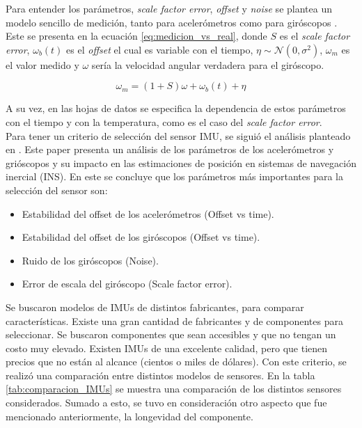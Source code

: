 Para entender los parámetros, \textit{scale factor error}, \textit{offset} y \textit{noise} se plantea un modelo sencillo de medición, tanto para acelerómetros como para giróscopos \cite{borodacz2022review}. Este se presenta en la ecuación \eqref{eq:medicion_vs_real}, donde $S$ es el \textit{scale factor error}, $\omega_b(t)$ es el \textit{offset} el cual es variable con el tiempo, $\eta \sim \mathcal{N}(0,\sigma^2)$, $\omega_m$ es el valor medido y $\omega$ sería la velocidad angular verdadera para el giróscopo.

\begin{equation}
    \omega_m = (1+S)\omega + \omega_b (t) + \eta
    \label{eq:medicion_vs_real}
\end{equation}

A su vez, en las hojas de datos se especifica la dependencia de estos parámetros con el tiempo y con la temperatura, como es el caso del \textit{scale factor error}.\\

Para tener un criterio de selección del sensor IMU, se siguió el análisis planteado en \cite{borodacz2022review}. Este paper presenta un análisis de los parámetros de los acelerómetros y grióscopos y su impacto en las estimaciones de posición en sistemas de navegación inercial (INS). En este se concluye que los parámetros más importantes para la selección del sensor son:

\begin{itemize}
    \item Estabilidad del offset de los acelerómetros (Offset vs time).
    \item Estabilidad del offset de los giróscopos (Offset vs time).
    \item Ruido de los giróscopos (Noise).
    \item Error de escala del giróscopo (Scale factor error).
\end{itemize}

Se buscaron modelos de IMUs de distintos fabricantes, para comparar características. Existe una gran cantidad de fabricantes y de componentes para seleccionar. Se buscaron componentes que sean accesibles y que no tengan un costo muy elevado. Existen IMUs de una excelente calidad, pero que tienen precios que no están al alcance (cientos o miles de dólares). Con este criterio, se realizó una comparación entre distintos modelos de sensores. En la tabla \ref{tab:comparacion_IMUs} se muestra una comparación de los distintos sensores considerados. Sumado a esto, se tuvo en consideración otro aspecto que fue mencionado anteriormente, la longevidad del componente.

